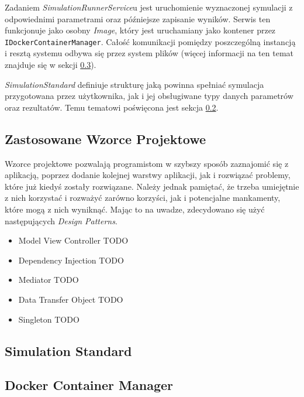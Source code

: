 \par Zadaniem \emph{SimulationRunnerService}u jest uruchomienie wyznaczonej symulacji z odpowiednimi parametrami oraz późniejsze zapisanie wyników. Serwis ten funkcjonuje jako osobny \emph{\docker Image}, który jest uruchamiany jako kontener przez \texttt{IDockerContainerManager}. Całość komunikacji pomiędzy poszczególną instancją i resztą systemu odbywa się przez system plików (więcej informacji na ten temat znajduje się w sekcji \ref{sec:dockerContainerManager}).

\par \emph{SimulationStandard} definiuje strukturę jaką powinna spełniać symulacja przygotowana przez użytkownika, jak i jej obsługiwane typy danych parametrów oraz rezultatów. Temu tematowi poświęcona jest sekcja \ref{sec:simulationStandard}.

\subsection{Zastosowane Wzorce Projektowe}

\par Wzorce projektowe pozwalają programistom w szybszy sposób zaznajomić się z aplikacją, poprzez dodanie kolejnej warstwy aplikacji, jak i rozwiązać problemy, które już kiedyś zostały rozwiązane. Należy jednak pamiętać, że trzeba umiejętnie z nich korzystać i rozważyć zarówno korzyści, jak i potencjalne mankamenty, które mogą z nich wyniknąć. Mając to na uwadze, zdecydowano się użyć następujących \emph{Design Patterns}.

\begin{itemize}
	\item Model View Controller TODO %
	\item Dependency Injection TODO %
	\item Mediator TODO %
	\item Data Transfer Object TODO %
	\item Singleton TODO %
\end{itemize}

\subsection{Simulation Standard}
\label{sec:simulationStandard}

\subsection{Docker Container Manager}
\label{sec:dockerContainerManager}

